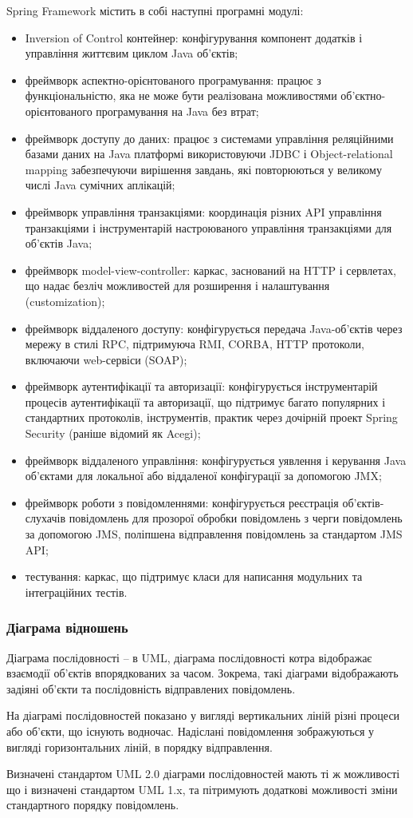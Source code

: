 \par Spring Framework містить в собі наступні програмні модулі:
\begin{itemize}
\item Inversion of Control контейнер: конфігурування компонент додатків і управління життєвим циклом Java об'єктів;
\item фреймворк аспектно-орієнтованого програмування: працює з функціональністю, яка не може бути реалізована можливостями об'єктно-орієнтованого програмування на Java без втрат;
\item фреймворк доступу до даних: працює з системами управління реляційними базами даних на Java платформі використовуючи JDBC і Object-relational mapping забезпечуючи вирішення завдань, які повторюються у великому числі Java сумічних аплікацій;
\item фреймворк управління транзакціями: координація різних API управління транзакціями і інструментарій настроюваного управління транзакціями для об'єктів Java;
\item фреймворк model-view-controller: каркас, заснований на HTTP і сервлетах, що надає безліч можливостей для розширення і налаштування (customization);
\item фреймворк віддаленого доступу: конфігурується передача Java-об'єктів через мережу в стилі RPC, підтримуюча RMI, CORBA, HTTP протоколи, включаючи web-сервіси (SOAP);
\item фреймворк аутентифікації та авторизації: конфігурується інструментарій процесів аутентифікації та авторизації, що підтримує багато популярних і стандартних протоколів, інструментів, практик через дочірній проект Spring Security (раніше відомий як Acegi);
\item фреймворк віддаленого управління: конфігурується уявлення і керування Java об'єктами для локальної або віддаленої конфігурації за допомогою JMX;
\item фреймворк роботи з повідомленнями: конфігурується реєстрація об'єктів-слухачів повідомлень для прозорої обробки повідомлень з черги повідомлень за допомогою JMS, поліпшена відправлення повідомлень за стандартом JMS API;
\item тестування: каркас, що підтримує класи для написання модульних та інтеграційних тестів.
\end{itemize}

\subsubsection{Діаграма відношень}
\par Діаграма послідовності -- в UML, діаграма послідовності котра відображає взаємодії об'єктів впорядкованих за часом. Зокрема, такі діаграми відображають задіяні об'єкти та послідовність відправлених повідомлень.
\par На діаграмі послідовностей показано у вигляді вертикальних ліній різні процеси або об'єкти, що існують водночас. Надіслані повідомлення зображуються у вигляді горизонтальних ліній, в порядку відправлення.
\par Визначені стандартом UML 2.0 діаграми послідовностей мають ті ж можливості що і визначені стандартом UML 1.x, та пітримують додаткові можливості зміни стандартного порядку повідомлень.

